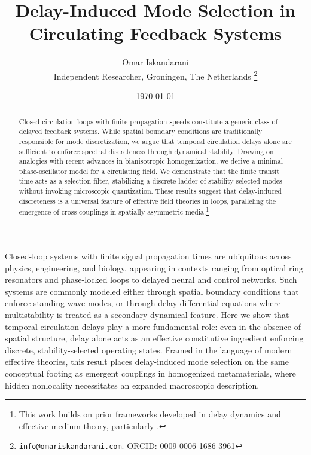\documentclass[11pt,a4paper]{article}
\begin{document}
    \title{Delay-Induced Mode Selection in Circulating Feedback Systems}
    \author{%
        Omar Iskandarani\\
        \small Independent Researcher, Groningen, The Netherlands%
        \thanks{\texttt{info@omariskandarani.com}. ORCID: 0009-0006-1686-3961}%
    }
    \date{\today}

    \maketitle
    \begin{abstract}
        Closed circulation loops with finite propagation speeds constitute a generic class of delayed feedback systems. While spatial boundary conditions are traditionally responsible for mode discretization, we argue that temporal circulation delays alone are sufficient to enforce spectral discreteness through dynamical stability. Drawing on analogies with recent advances in bianisotropic homogenization, we derive a minimal phase-oscillator model for a circulating field. We demonstrate that the finite transit time acts as a selection filter, stabilizing a discrete ladder of stability-selected modes without invoking microscopic quantization. These results suggest that delay-induced discreteness is a universal feature of effective field theories in loops, paralleling the emergence of cross-couplings in spatially asymmetric media.\footnote{This work builds on prior frameworks developed in delay dynamics and effective medium theory, particularly \cite{Willis2012, Yanchuk2017}.}
    \end{abstract}

    \par
    \noindent
    \normalfont\normalsize\justifying
    Closed-loop systems with finite signal propagation times are ubiquitous across physics, engineering, and biology, appearing in contexts ranging from optical ring resonators and phase-locked loops to delayed neural and control networks. Such systems are commonly modeled either through spatial boundary conditions that enforce standing-wave modes, or through delay-differential equations where multistability is treated as a secondary dynamical feature.
    Here we show that temporal circulation delays play a more fundamental role: even in the absence of spatial structure, delay alone acts as an effective constitutive ingredient enforcing discrete, stability-selected operating states.
     Framed in the language of modern effective theories, this result places delay-induced mode selection on the same conceptual footing as emergent couplings in homogenized metamaterials, where hidden nonlocality necessitates an expanded macroscopic description.
\end{document}
